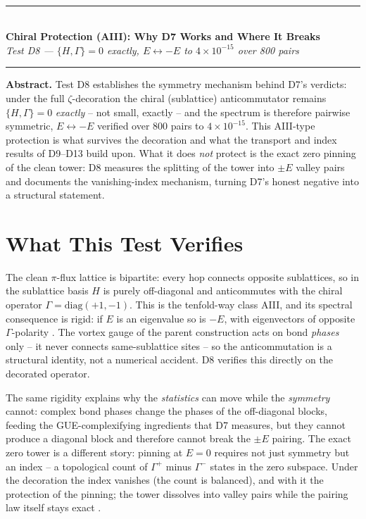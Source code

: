 \documentclass[11pt,a4paper]{article}
\begin{document}
\\[0.3em]
\rule{\textwidth}{0.8pt}\\[0.6em]
{\LARGE\bfseries\color{labblue} Chiral Protection (AIII): Why D7 Works and Where It Breaks}\\[0.5em]
{\normalsize\itshape Test D8 — $\{H,\Gamma\} = 0$ exactly, $E \leftrightarrow -E$ to $4\times10^{-15}$ over 800 pairs}\\[0.4em]
\rule{\textwidth}{0.4pt}

\begin{tcolorbox}[colback=labgreen!8, colframe=labgreen!70!black, title={Verdict: PASS — 4/4 checks}, fonttitle=\bfseries, boxrule=0.6pt]
\textbf{Abstract.} Test D8 establishes the symmetry mechanism behind D7's verdicts: under the full $\zeta$-decoration the chiral (sublattice) anticommutator remains $\{H, \Gamma\} = 0$ \emph{exactly} -- not small, exactly -- and the spectrum is therefore pairwise symmetric, $E \leftrightarrow -E$ verified over 800 pairs to $4\times10^{-15}$. This AIII-type protection is what survives the decoration and what the transport and index results of D9--D13 build upon. What it does \emph{not} protect is the exact zero pinning of the clean tower: D8 measures the splitting of the tower into $\pm E$ valley pairs and documents the vanishing-index mechanism, turning D7's honest negative into a structural statement.
\end{tcolorbox}

\section{What This Test Verifies}
The clean $\pi$-flux lattice is bipartite: every hop connects opposite sublattices, so in the sublattice basis $H$ is purely off-diagonal and anticommutes with the chiral operator $\Gamma = \mathrm{diag}(+1, -1)$. This is the tenfold-way class AIII, and its spectral consequence is rigid: if $E$ is an eigenvalue so is $-E$, with eigenvectors of opposite $\Gamma$-polarity \cite{mecklenburgshen}. The vortex gauge of the parent construction acts on bond \emph{phases} only -- it never connects same-sublattice sites -- so the anticommutation is a structural identity, not a numerical accident. D8 verifies this directly on the decorated operator.

The same rigidity explains why the \emph{statistics} can move while the \emph{symmetry} cannot: complex bond phases change the phases of the off-diagonal blocks, feeding the GUE-complexifying ingredients that D7 measures, but they cannot produce a diagonal block and therefore cannot break the $\pm E$ pairing. The exact zero tower is a different story: pinning at $E = 0$ requires not just symmetry but an index -- a topological count of $\Gamma^+$ minus $\Gamma^-$ states in the zero subspace. Under the decoration the index vanishes (the count is balanced), and with it the protection of the pinning; the tower dissolves into valley pairs while the pairing law itself stays exact \cite{atyahbott}.
\end{document}
